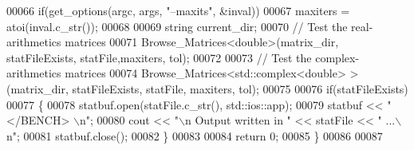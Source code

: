 \begin{DoxyCode}
00066   \textcolor{keywordflow}{if}(get\_options(argc, args, \textcolor{stringliteral}{"--maxits"}, &inval))
00067     maxiters = atoi(inval.c\_str()); 
00068   
00069   \textcolor{keywordtype}{string} current\_dir; 
00070   \textcolor{comment}{// Test the real-arithmetics matrices}
00071   Browse\_Matrices<double>(matrix\_dir, statFileExists, statFile,maxiters, tol);
00072   
00073   \textcolor{comment}{// Test the complex-arithmetics matrices}
00074   Browse\_Matrices<std::complex<double> >(matrix\_dir, statFileExists, statFile, maxiters, tol); 
00075   
00076   \textcolor{keywordflow}{if}(statFileExists)
00077   \{
00078     statbuf.open(statFile.c\_str(), std::ios::app); 
00079     statbuf << \textcolor{stringliteral}{"</BENCH> \(\backslash\)n"};
00080     cout << \textcolor{stringliteral}{"\(\backslash\)n Output written in "} << statFile << \textcolor{stringliteral}{" ...\(\backslash\)n"};
00081     statbuf.close();
00082   \}
00083 
00084   \textcolor{keywordflow}{return} 0;
00085 \}
00086 
00087       
\end{DoxyCode}
